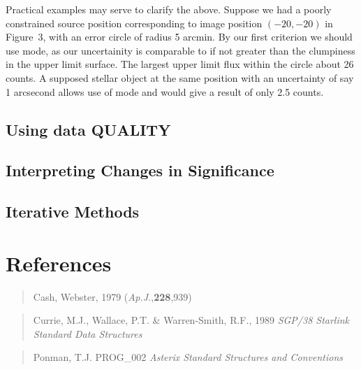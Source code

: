 Practical examples may serve to clarify the above. Suppose we had a poorly
constrained source position corresponding to image position $(-20,-20)$ in
Figure~3, with an error circle of radius 5 arcmin. By our first criterion
we should use  mode, as our uncertainity is comparable to if
not greater than the clumpiness in the upper limit surface. The largest
upper limit flux within the circle about 26 counts. A supposed stellar
object at the same position with an uncertainty of say 1 arcsecond allows
use of  mode and would give a result of only 2.5 counts.


\subsection{Using data QUALITY}
\label{tech:qual}

\subsection{Interpreting Changes in Significance}
\label{tech:dsig}

\subsection{Iterative Methods}

\section{References}

\setlength{\parindent}{-3mm}

\begin{verse}
\hspace{-9.2mm}
Cash, Webster, 1979 ({\it Ap.J.},{\bf 228},939)
\vspace{-2mm}
\end{verse}

\begin{verse}
\hspace{-9.2mm}
Currie, M.J., Wallace, P.T. \& Warren-Smith, R.F., 1989 {\it SGP/38 Starlink
Standard Data Structures}
\vspace{-2mm}
\end{verse}

\begin{verse}
\hspace{-9.2mm}
Ponman, T.J. PROG\_002 {\it Asterix Standard Structures and Conventions}
\vspace{-2mm}
\end{verse}

